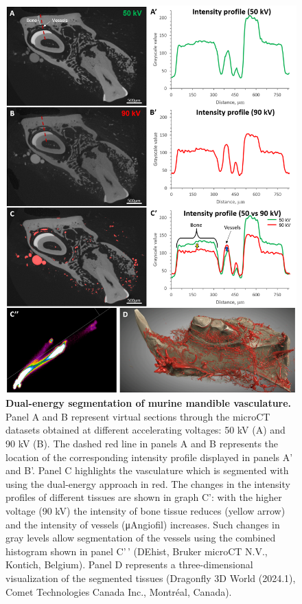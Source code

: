 \begin{figure}
\hypertarget{fig:7}{%
\centering
\includegraphics{images/Fig7_DualEnergy.png}
\caption{\textbf{Dual-energy segmentation of murine mandible vasculature.}
Panel A and B represent virtual sections through the microCT datasets obtained at different accelerating voltages: 50 kV (A) and 90 kV (B).
The dashed red line in panels A and B represents the location of the corresponding intensity profile displayed in panels A' and B'.
Panel C highlights the vasculature which is segmented with using the dual-energy approach in red.
The changes in the intensity profiles of different tissues are shown in graph C': with the higher voltage (90 kV) the intensity of bone tissue reduces (yellow arrow) and the intensity of vessels (μAngiofil) increases.
Such changes in gray levels allow segmentation of the vessels using the combined histogram shown in panel C'\,' (DEhist, Bruker microCT N.V., Kontich, Belgium).
Panel D represents a three-dimensional visualization of the segmented tissues (Dragonfly 3D World (2024.1), Comet Technologies Canada Inc., Montréal, Canada).}\label{fig:7}
}
\end{figure}

